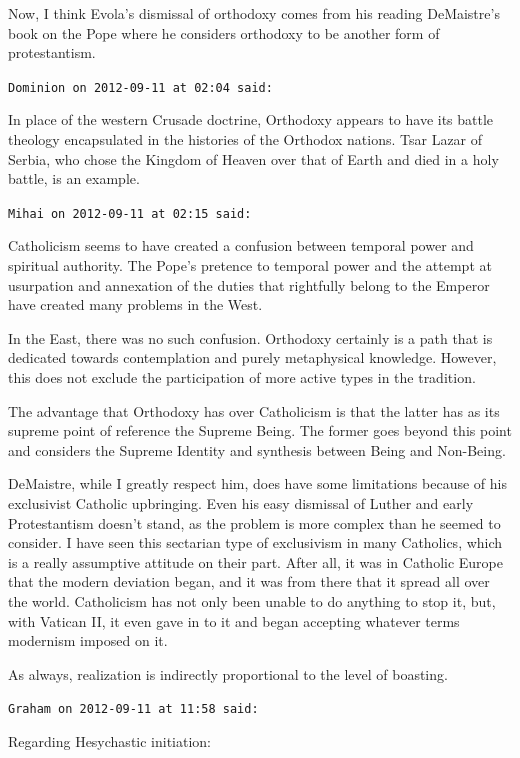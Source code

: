 \begin{footnotesize}
\begin{sffamily}
Now, I think Evola's dismissal of orthodoxy comes from his reading DeMaistre's book on the Pope where he considers orthodoxy to be another form of protestantism.


\hfill

\texttt{Dominion on 2012-09-11 at 02:04 said: }

In place of the western Crusade doctrine, Orthodoxy appears to have its battle theology encapsulated in the histories of the Orthodox nations. Tsar Lazar of Serbia, who chose the Kingdom of Heaven over that of Earth and died in a holy battle, is an example.


\hfill

\texttt{Mihai on 2012-09-11 at 02:15 said: }

Catholicism seems to have created a confusion between temporal power and spiritual authority. The Pope's pretence to temporal power and the attempt at usurpation and annexation of the duties that rightfully belong to the Emperor have created many problems in the West.

In the East, there was no such confusion. Orthodoxy certainly is a path that is dedicated towards contemplation and purely metaphysical knowledge. However, this does not exclude the participation of more active types in the tradition.

The advantage that Orthodoxy has over Catholicism is that the latter has as its supreme point of reference the Supreme Being. The former goes beyond this point and considers the Supreme Identity and synthesis between Being and Non-Being. 

DeMaistre, while I greatly respect him, does have some limitations because of his exclusivist Catholic upbringing. Even his easy dismissal of Luther and early Protestantism doesn't stand, as the problem is more complex than he seemed to consider. I have seen this sectarian type of exclusivism in many Catholics, which is a really assumptive attitude on their part. After all, it was in Catholic Europe that the modern deviation began, and it was from there that it spread all over the world. Catholicism has not only been unable to do anything to stop it, but, with Vatican II, it even gave in to it and began accepting whatever terms modernism imposed on it.

As always, realization is indirectly proportional to the level of boasting.


\hfill

\texttt{Graham on 2012-09-11 at 11:58 said: }

Regarding Hesychastic initiation:


\end{sffamily}
\end{footnotesize}
